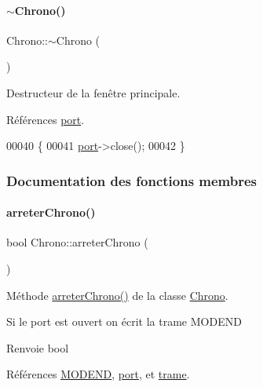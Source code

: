 \paragraph{\texorpdfstring{$\sim$\+Chrono()}{~Chrono()}}
{\footnotesize\ttfamily Chrono\+::$\sim$\+Chrono (\begin{DoxyParamCaption}{ }\end{DoxyParamCaption})}



Destructeur de la fenêtre principale. 



Références \hyperlink{class_chrono_aca5fbe0eebd7f876f954d4a99c564167}{port}.


\begin{DoxyCode}
00040 \{
00041     \hyperlink{class_chrono_aca5fbe0eebd7f876f954d4a99c564167}{port}->close();
00042 \}
\end{DoxyCode}


\subsubsection{Documentation des fonctions membres}
\mbox{\label{class_chrono_a5e2781ab78dcaa0ecb37e301399d819b}} 
\paragraph{\texorpdfstring{arreter\+Chrono()}{arreterChrono()}}
{\footnotesize\ttfamily bool Chrono\+::arreter\+Chrono (\begin{DoxyParamCaption}{ }\end{DoxyParamCaption})}



Méthode \hyperlink{class_chrono_a5e2781ab78dcaa0ecb37e301399d819b}{arreter\+Chrono()} de la classe \hyperlink{class_chrono}{Chrono}. 

Si le port est ouvert on écrit la trame M\+O\+D\+E\+ND \begin{DoxyReturn}{Renvoie}
bool 
\end{DoxyReturn}


Références \hyperlink{chrono_8h_a95708e00882b95a7b2d68b2f75c3913c}{M\+O\+D\+E\+ND}, \hyperlink{class_chrono_aca5fbe0eebd7f876f954d4a99c564167}{port}, et \hyperlink{class_chrono_a26f2155aa6e5ef4296e5456b64a713b5}{trame}.



